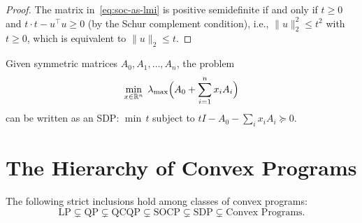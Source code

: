 \documentclass[11pt,a4paper]{article}
\begin{document}
\begin{proof}
The matrix in~\eqref{eq:soc-as-lmi} is positive semidefinite if and only if
$t \ge 0$ and $t \cdot t - u^\top u \ge 0$ (by the Schur complement condition),
i.e., $\|u\|_2^2 \le t^2$ with $t \ge 0$, which is equivalent to
$\|u\|_2 \le t$.
\end{proof}

\begin{example}\label{ex:max-eig}
Given symmetric matrices $A_0, A_1, \dots, A_n$, the problem
\[
  \min_{x \in \mathbb{R}^n} \; \lambda_{\max}\Bigl(A_0 + \sum_{i=1}^n x_i A_i\Bigr)
\]
can be written as an SDP: $\min\, t$ subject to
$tI - A_0 - \sum_i x_i A_i \succeq 0$.
\end{example}


\section{The Hierarchy of Convex Programs}\label{sec:hierarchy}

\begin{theorem}\label{thm:hierarchy}
The following strict inclusions hold among classes of convex programs:
\begin{equation}\label{eq:hierarchy}
  \text{LP} \subsetneq \text{QP} \subsetneq \text{QCQP}
  \subsetneq \text{SOCP} \subsetneq \text{SDP}
  \subsetneq \text{Convex Programs}.
\end{equation}
\end{theorem}
\end{document}
